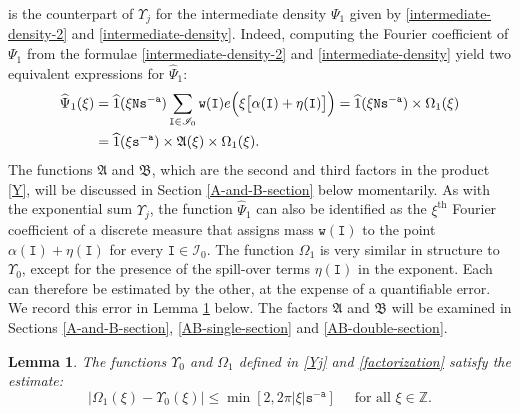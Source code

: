 \documentclass[12pt, twoside]{article}
\newtheorem{lemma}[theorem]{Lemma}
\theoremstyle{definition}
\numberwithin{equation}{section}
\begin{document}
is the counterpart of $\Upsilon_j$ for the intermediate density $\Psi_1$ given by \eqref{intermediate-density-2} and \eqref{intermediate-density}. Indeed, computing the Fourier coefficient of $\Psi_1$ from the formulae \eqref{intermediate-density-2} and \eqref{intermediate-density} yield two equivalent expressions for $\widehat{\Psi}_1$:   
\begin{align} \label{intermediate-Fourier-coefficient} 
\widehat{\Psi}_1(\xi) &= \widehat{1}(\xi \mathtt N \mathtt s^{-\mathtt a}) \sum_{\mathtt I \in \mathscr{I}_0} \mathtt w(\mathtt I)  e \Bigl(\xi \bigl[\alpha(\mathtt I) + \eta(\mathtt I) \bigr]\Bigr)  =  \widehat{1}(\xi \mathtt N \mathtt s^{-\mathtt a}) \times \Omega_1(\xi) \\ 
 &=  \widehat{1}(\xi \mathtt s^{-\mathtt a}) \times \mathfrak A(\xi) \times \Omega_1(\xi). \label{intermediate-Fourier-coefficient-2} 
\end{align}   
The functions $\mathfrak A$ and $\mathfrak B$, which are the second and third factors in the product \eqref{Y}, will be discussed in Section \ref{A-and-B-section} below momentarily. As with the exponential sum $\Upsilon_j$, the function $\widehat{\Psi}_1$ can also be identified as the $\xi^{\text{th}}$ Fourier coefficient of a discrete measure that assigns mass $\mathtt w(\mathtt I)$ to the point $\alpha(\mathtt I) + \eta(\mathtt I)$ for every $\mathtt I \in \mathscr{I}_0$.    
The function $\Omega_1$ is very similar in structure to $\Upsilon_0$, except for the presence of the spill-over terms $\eta(\mathtt I)$ in the exponent. Each can therefore be estimated by the other, at the expense of a quantifiable error. We record this error in Lemma \ref{error-lemma} below. The factors $\mathfrak A$ and $\mathfrak B$ will be examined in Sections \ref{A-and-B-section}, \ref{AB-single-section} and \ref{AB-double-section}.  
\begin{lemma} \label{error-lemma} 
The functions $\Upsilon_0$ and $\Omega_1$ defined in \eqref{Yj} and \eqref{factorization} satisfy the estimate:  
\begin{equation} \label{difference} 
|\Omega_1(\xi) - \Upsilon_0(\xi)| \leq \min \left[2, 2 \pi |\xi| \mathtt s^{-\mathtt a}\right] \quad \text{ for all } \xi \in \mathbb Z. 
\end{equation}
\end{lemma} 
\end{document}
